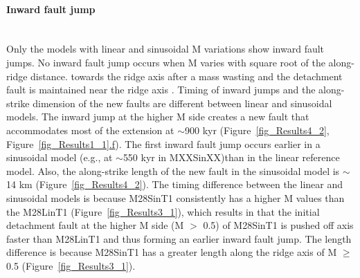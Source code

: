 \paragraph{Inward fault jump}\label{para_InwardFaultJump}
~\\
Only the models with linear and sinusoidal M variations show inward fault jumps. No inward fault jump occurs when M varies with square root of the along-ridge distance.  towards the ridge axis after a mass wasting and the detachment fault is maintained near the ridge axis .
Timing of inward jumps and the along-strike dimension of the new faults are different between linear and sinusoidal models. The inward jump at the higher M side creates a new fault that accommodates most of the extension at $\sim$900 kyr %
(Figure~\hyperref[fig_Results4_2]{\ref{fig_Results4_2}}, Figure~\hyperref[fig_Results1_1]{\ref{fig_Results1_1}.f}).
The first inward fault jump occurs earlier in a sinusoidal model (e.g., at $\sim$550 kyr in MXXSinXX)than in the linear reference model. Also, the along-strike length of the new fault in the sinusoidal model is $\sim$14 km (Figure~\hyperref[fig_Results4_2]{\ref{fig_Results4_2}}).
%
The timing difference between the linear and sinusoidal models is because M28SinT1 consistently has a higher M values than the M28LinT1 (Figure~\hyperref[fig_Results3_1]{\ref{fig_Results3_1}}), which results in that the initial detachment fault at the higher M side (M $>$ 0.5) of M28SinT1 is pushed off axis faster than M28LinT1 and thus forming an earlier inward fault jump. The length difference is because M28SinT1 has a greater length along the ridge axis of M $\ge$ 0.5 (Figure~\hyperref[fig_Results3_1]{\ref{fig_Results3_1}}). 
%
